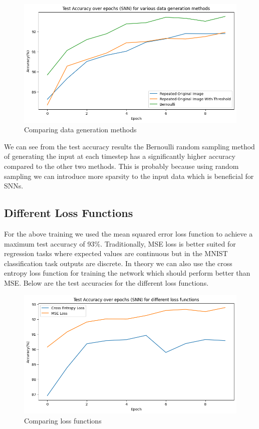 \documentclass[12pt, letterpaper]{article}
\begin{document}
\begin{figure}[H]
    \centering
    \includegraphics[width=1\textwidth]{data_gen.png}
    \caption{Comparing data generation methods}
    \label{fig:data_gen}
\end{figure}

We can see from the test accuracy results the Bernoulli random sampling method of generating the input at each timestep has a significantly higher accuracy compared to the other two methods. This is probably because using random sampling we can introduce more sparsity to the input data which is beneficial for SNNs. 

\subsection{Different Loss Functions}
For the above training we used the mean squared error loss function to achieve a maximum test accuracy of 93\%. Traditionally, MSE loss is better suited for regression tasks where expected values are continuous but in the MNIST classification task outputs are discrete. In theory we can also use the cross entropy loss function for training the network which should perform better than MSE. Below are the test accuracies for the different loss functions.

\begin{figure}[H]
    \centering
    \includegraphics[width=1\textwidth]{loss_functions.png}
    \caption{Comparing loss functions}
    \label{fig:loss_functions}
\end{figure}
\end{document}
